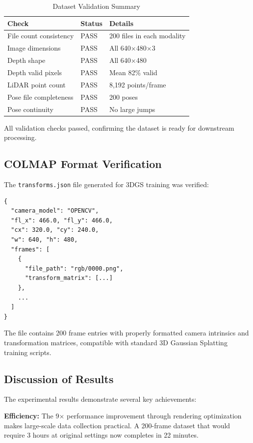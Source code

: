 \begin{table}[htbp]
\centering
\caption{Dataset Validation Summary}
\label{tab:validation}
\begin{tabular}{@{}lll@{}}
\toprule
\textbf{Check} & \textbf{Status} & \textbf{Details} \\
\midrule
File count consistency & PASS & 200 files in each modality \\
Image dimensions & PASS & All 640$\times$480$\times$3 \\
Depth shape & PASS & All 640$\times$480 \\
Depth valid pixels & PASS & Mean 82\% valid \\
LiDAR point count & PASS & 8,192 points/frame \\
Pose file completeness & PASS & 200 poses \\
Pose continuity & PASS & No large jumps \\
\bottomrule
\end{tabular}
\end{table}

All validation checks passed, confirming the dataset is ready for downstream processing.

\subsection{COLMAP Format Verification}

The \texttt{transforms.json} file generated for 3DGS training was verified:

\begin{lstlisting}[language={}, caption={Excerpt from transforms.json}]
{
  "camera_model": "OPENCV",
  "fl_x": 466.0, "fl_y": 466.0,
  "cx": 320.0, "cy": 240.0,
  "w": 640, "h": 480,
  "frames": [
    {
      "file_path": "rgb/0000.png",
      "transform_matrix": [...]
    },
    ...
  ]
}
\end{lstlisting}

The file contains 200 frame entries with properly formatted camera intrinsics and transformation matrices, compatible with standard 3D Gaussian Splatting training scripts.

\subsection{Discussion of Results}

The experimental results demonstrate several key achievements:

\textbf{Efficiency:} The 9$\times$ performance improvement through rendering optimization makes large-scale data collection practical. A 200-frame dataset that would require 3 hours at original settings now completes in 22 minutes.

